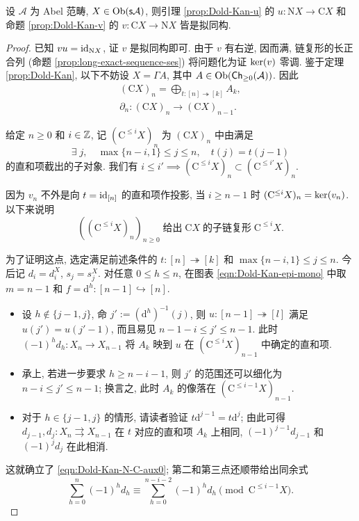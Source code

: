 \begin{theorem}\label{prop:Dold-Kan-N-C}
	设 $\mathcal{A}$ 为 Abel 范畴, $X \in \operatorname{Ob}(\mathsf{s}\mathcal{A})$, 则引理 \ref{prop:Dold-Kan-u} 的 $u: \mathrm{N}X \to \mathrm{C}X$ 和命题 \ref{prop:Dold-Kan-v} 的 $v: \mathrm{C}X \to \mathrm{N}X$ 皆是拟同构.
\end{theorem}
\begin{proof}
	已知 $vu = \mathrm{id}_{\mathrm{N}X}$, 证 $v$ 是拟同构即可. 由于 $v$ 有右逆, 因而满, 链复形的长正合列 (命题 \ref{prop:long-exact-sequence-ses}) 将问题化为证 $\operatorname{ker}(v)$ 零调. 鉴于定理 \ref{prop:Dold-Kan}, 以下不妨设 $X = \Gamma A$, 其中 $A \in \operatorname{Ob}(\mathsf{Ch}_{\geq 0}(\mathcal{A}))$. 因此
	\begin{gather*}
		(\mathrm{C}X)_n = \bigoplus_{t: [n] \twoheadrightarrow [k]} A_k, \\
		\partial_n : (\mathrm{C}X)_n \to (\mathrm{C}X)_{n-1}.
	\end{gather*}
	
	给定 $n \geq 0$ 和 $i \in \mathbb{Z}$, 记 $(\mathrm{C}^{\leq i} X)_n$ 为 $(\mathrm{C}X)_n$ 中由满足
	\[ \exists \; j, \quad \max\{n-i, 1\} \leq j \leq n, \quad t(j) = t(j-1) \]
	的直和项截出的子对象. 我们有 $i \leq i' \implies (\mathrm{C}^{\leq i} X)_n \subset (\mathrm{C}^{\leq i'} X)_n$.

	因为 $v_n$ 不外是向 $t = \mathrm{id}_{[n]}$ 的直和项作投影, 当 $i \geq n-1$ 时 $(\mathrm{C}^{\leq i} X)_n = \operatorname{ker}(v_n)$. 以下来说明
	\begin{equation}\label{eqn:Dold-Kan-N-C-aux0}
		\left( (\mathrm{C}^{\leq i} X)_n \right)_{n \geq 0} \;\text{给出}\; \mathrm{C}X \;\text{的子链复形}\; \mathrm{C}^{\leq i} X.
	\end{equation}

	为了证明这点, 选定满足前述条件的 $t: [n] \twoheadrightarrow [k]$ 和 $\max\{n-i, 1\} \leq j \leq n$. 今后记 $d_i = d_i^X$, $s_j = s_j^X$. 对任意 $0 \leq h \leq n$, 在图表 \eqref{eqn:Dold-Kan-epi-mono} 中取 $m = n-1$ 和 $f = \mathrm{d}^h : [n-1] \hookrightarrow [n]$.
	\begin{itemize}
		\item 设 $h \notin \{j-1, j\}$, 命 $j' := (\mathrm{d}^h)^{-1}(j)$, 则 $u: [n-1] \twoheadrightarrow [l]$ 满足 $u(j') = u(j'-1)$, 而且易见 $n - 1 - i \leq j' \leq n-1$. 此时 $(-1)^h d_h: X_n \to X_{n-1}$ 将 $A_k$ 映到 $u$ 在 $(\mathrm{C}^{\leq i} X)_{n-1}$ 中确定的直和项.
		\item 承上, 若进一步要求 $h \geq n-i-1$, 则 $j'$ 的范围还可以细化为 $n-i \leq j' \leq n-1$; 换言之, 此时 $A_k$ 的像落在 $(\mathrm{C}^{\leq i-1} X)_{n-1}$.
		\item 对于 $h \in \{j-1, j\}$ 的情形, 请读者验证 $t\mathrm{d}^{j-1} = t\mathrm{d}^j$; 由此可得 $d_{j-1}, d_j: X_n \rightrightarrows X_{n-1}$ 在 $t$ 对应的直和项 $A_k$ 上相同, $(-1)^{j-1} d_{j-1}$ 和 $(-1)^j d_j$ 在此相消.
	\end{itemize}
	这就确立了 \eqref{eqn:Dold-Kan-N-C-aux0}; 第二和第三点还顺带给出同余式
	\begin{equation}\label{eqn:Dold-Kan-N-C-aux}
		\sum_{h=0}^n (-1)^h d_h \equiv \sum_{h=0}^{n-i-2} (-1)^h d_h \pmod{ \mathrm{C}^{\leq i-1} X }.
	\end{equation}


\end{proof}
